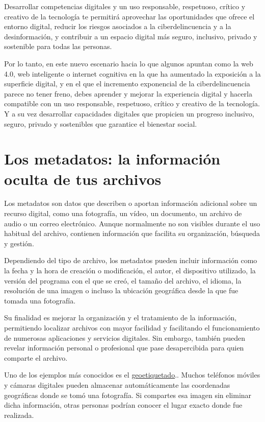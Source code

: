 \documentclass[
  spanish,
  a4paper,
  openany]{book}
\begin{document}
Desarrollar competencias digitales y un uso responsable, respetuoso, crítico y creativo de la tecnología te permitirá aprovechar las oportunidades que ofrece el entorno digital, reducir los riesgos asociados a la ciberdelincuencia y a la desinformación, y contribuir a un espacio digital más seguro, inclusivo, privado y sostenible para todas las personas.

Por lo tanto, en este nuevo escenario hacia lo que algunos apuntan como la web 4.0, web inteligente o internet cognitiva en la que ha aumentado la exposición a la superficie digital, y en el que el incremento exponencial de la ciberdelincuencia parece no tener freno, debes aprender y mejorar la experiencia digital y hacerla compatible con un uso responsable, respetuoso, crítico y creativo de la tecnología. Y a su vez desarrollar capacidades digitales que propicien un progreso inclusivo, seguro, privado y sostenibles que garantice el bienestar social.

\section{Los metadatos: la información oculta de tus archivos}\label{los-metadatos-la-informaciuxf3n-oculta-de-tus-archivos}

Los metadatos son datos que describen o aportan información adicional sobre un recurso digital, como una fotografía, un vídeo, un documento, un archivo de audio o un correo electrónico. Aunque normalmente no son visibles durante el uso habitual del archivo, contienen información que facilita su organización, búsqueda y gestión.

Dependiendo del tipo de archivo, los metadatos pueden incluir información como la fecha y la hora de creación o modificación, el autor, el dispositivo utilizado, la versión del programa con el que se creó, el tamaño del archivo, el idioma, la resolución de una imagen o incluso la ubicación geográfica desde la que fue tomada una fotografía.

Su finalidad es mejorar la organización y el tratamiento de la información, permitiendo localizar archivos con mayor facilidad y facilitando el funcionamiento de numerosas aplicaciones y servicios digitales. Sin embargo, también pueden revelar información personal o profesional que pase desapercibida para quien comparte el archivo.

Uno de los ejemplos más conocidos es el \href{https://es.wikipedia.org/wiki/Geoetiquetado}{geoetiquetado}.. Muchos teléfonos móviles y cámaras digitales pueden almacenar automáticamente las coordenadas geográficas donde se tomó una fotografía. Si compartes esa imagen sin eliminar dicha información, otras personas podrían conocer el lugar exacto donde fue realizada.
\end{document}

